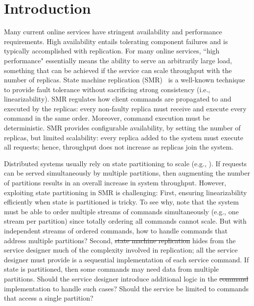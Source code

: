 \documentclass[10pt, conference, compsocconf, letterpaper]{IEEEtranv17}
\providecommand{\DIFadd}[1]{{\protect\color{blue}\uwave{#1}}} %
\providecommand{\DIFdel}[1]{{\protect\color{red}\sout{#1}}}                      %
\providecommand{\DIFaddbegin}{} %
\providecommand{\DIFaddend}{} %
\providecommand{\DIFdelbegin}{} %
\providecommand{\DIFdelend}{} %
\begin{document}

\section{Introduction}
\label{sec:introduction}

Many current online services have stringent availability and performance requirements.
High availability entails tolerating component failures and is typically accomplished with replication.
For many online services, ``high performance" essentially means the ability to serve an arbitrarily large load, something that can be achieved if the service can scale throughput with the number of replicas.
%
State machine replication (SMR)~\cite{Lam78, Sch90} is a well-known technique to provide fault tolerance without sacrificing strong consistency (i.e., linearizability).
%
SMR regulates how client commands are propagated to and executed by the replicas: every \mbox{non-faulty} replica must receive and execute every command in the same order. Moreover, command execution must be deterministic.
%
SMR provides configurable availability, by setting the number of replicas, but limited scalability: every replica added to the system must execute all requests; hence, throughput does not increase as replicas join the system.

Distributed systems usually rely on state partitioning to scale (e.g., \cite{facebookTAO, sciascia2012sdur}).
If requests can be served simultaneously by multiple partitions, then augmenting the number of partitions results in an overall increase in system throughput.
However, exploiting state partitioning in SMR is challenging:
First, ensuring linearizability efficiently when state is partitioned is tricky.  
To see why, note that the system must be able to order multiple streams of commands simultaneously (e.g., one stream per partition) since totally ordering all commands cannot scale.
But with independent streams of ordered commands, how to handle commands that address multiple partitions?
%
Second, \DIFdelbegin \DIFdel{state machine replication }\DIFdelend \DIFaddbegin \DIFadd{SMR }\DIFaddend hides from the service designer much of the complexity involved in replication; all the service designer must provide is a sequential implementation of each service command.
If state is partitioned, then some commands may need data from multiple partitions.
Should the service designer introduce additional logic in the \DIFdelbegin \DIFdel{command }\DIFdelend implementation to handle such cases?
Should the service be limited to commands that access a single partition?
\end{document}
